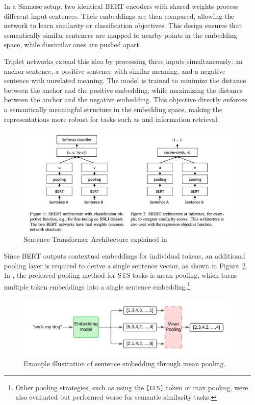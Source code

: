 In a Siamese setup, two identical BERT encoders with shared weights process different input sentences. Their embeddings are then compared, allowing the network to learn similarity or classification objectives. This design ensures that semantically similar sentences are mapped to nearby points in the embedding space, while dissimilar ones are pushed apart.

Triplet networks extend this idea by processing three inputs simultaneously: an anchor sentence, a positive sentence with similar meaning, and a negative sentence with unrelated meaning. The model is trained to minimize the distance between the anchor and the positive embedding, while maximizing the distance between the anchor and the negative embedding. This objective directly enforces a semantically meaningful structure in the embedding space, making the representations more robust for tasks such as  and information retrieval.
\begin{figure}[h!]
    \centering
    \includegraphics[width=1\linewidth]{Images/sentence_transformer.png}
    \caption{Sentence Transformer Architecture explained in\cite{reimers2019sentencebertsentenceembeddingsusing}}
    \label{fig:sentence-transformer-architecture}
\end{figure}
Since BERT outputs contextual embeddings for individual tokens, an additional pooling layer is required to derive a single sentence vector, as shown in Figure~\ref{fig:Sentence_embedding}. In \cite{reimers2019sentencebertsentenceembeddingsusing}, the preferred pooling method for \gls{STS} tasks is mean pooling, which turns multiple token embeddings into a single sentence embedding.\footnote{Other pooling strategies, such as using the \texttt{[CLS]} token or max pooling, were also evaluated but performed worse for semantic similarity tasks.}

\begin{figure}[h!]
    \centering
    \includegraphics[width=1\linewidth]{Figures/Sentence_Embedding.jpeg}
    \caption{Example illustration of sentence embedding through mean pooling.}
    \label{fig:Sentence_embedding}
\end{figure}

